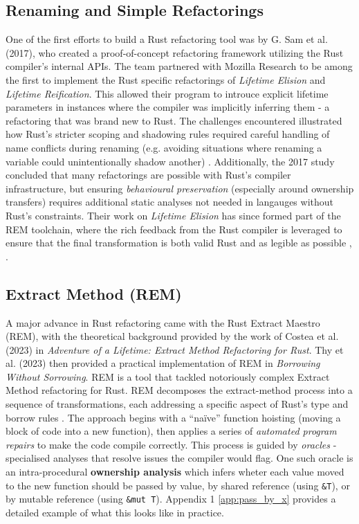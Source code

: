 \subsection{Renaming and Simple Refactorings}
One of the first efforts to build a Rust refactoring tool was by G. Sam et al.
(2017), who created a proof-of-concept refactoring framework utilizing the Rust
compiler's internal APIs. The team partnered with Mozilla Research to be among
the first to implement the Rust specific refactorings of \textit{Lifetime
Elision} and \textit{Lifetime Reification}. This allowed their program to
introuce explicit lifetime parameters in instances where the compiler was
implicitly inferring them - a refactoring that was brand new to Rust. The
challenges encountered illustrated how Rust's stricter scoping and shadowing
rules required careful handling of name conflicts during renaming (e.g. avoiding
situations where renaming a variable could unintentionally shadow another)
\cite{automated_refactoring_of_rust_programs}. Additionally, the 2017 study
concluded that many refactorings are possible with Rust's compiler
infrastructure, but ensuring \textit{behavioural preservation} (especially
around ownership transfers) requires additional static analyses not needed in
langauges without Rust's constraints. Their work on \textit{Lifetime Elision}
has since formed part of the REM toolchain, where the rich feedback from the
Rust compiler is leveraged to ensure that the final transformation is both
valid Rust and as legible as possible \cite{AdventureOfALifetime},
\cite{BorrowingWithoutSorrowing}.

\subsection{Extract Method (REM)}

A major advance in Rust refactoring came with the Rust Extract Maestro (REM),
with the theoretical background provided by the work of Costea et al. (2023) in
\textit{Adventure of a Lifetime: Extract Method Refactoring for Rust}. Thy et
al. (2023) then provided a practical implementation of REM in \textit{Borrowing
Without Sorrowing}. REM is a tool that tackled notoriously complex Extract
Method refactoring for Rust. REM decomposes the extract-method process into a
sequence of transformations, each addressing a specific aspect of Rust's type
and borrow rules \cite{AdventureOfALifetime}. The approach begins with a
``na\"ive'' function hoisting (moving a block of code into a new function), then
applies a series of \textit{automated program repairs} to make the code compile
correctly. This process is guided by \textit{oracles} - specialised analyses
that resolve issues the compiler would flag. One such oracle is an
intra-procedural \textbf{ownership analysis} which infers wheter each value
moved to the new function should be passed by value, by shared reference (using
\texttt{\&T}), or by mutable reference (using \texttt{\&mut T}). Appendix 1
\ref{app:pass_by_x} provides a detailed example of what this looks like in
practice.
